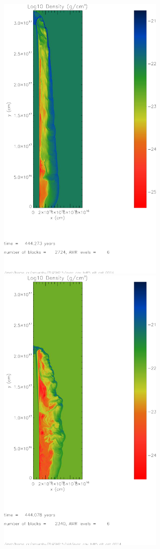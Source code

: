 \begin{figure}[t]
\begin{center}
   \begin{minipage}[t]{.48\linewidth}
\includegraphics[width=8cm]{cool_cav}
   \end{minipage} \hfill
   \begin{minipage}[t]{.48\linewidth}
\includegraphics[width=8cm]{cool_cdam}

\end{minipage}
\end{center}
\end{figure}
